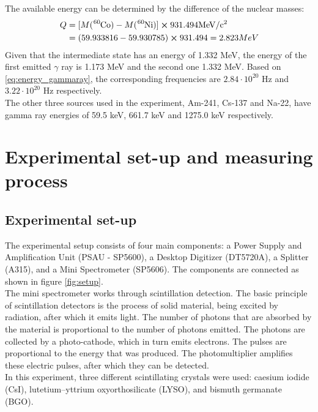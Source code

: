 \documentclass[a4paper, 11pt, table]{article}
\begin{document}
The available energy can be determined by the difference of the nuclear masses:
\begin{align*}
    Q & = [M(\ce{^{60}Co})  - M(\ce{^{60}Ni})]\cross 931.494 \mathrm{MeV/c^2} \\
      & = (59.933816 - 59.930785)\cross 931.494 = 2.823 MeV
\end{align*}
Given that the intermediate state has an energy of 1.332 MeV, the energy of the first emitted $\gamma$ ray is 1.173 MeV and the second one 1.332 MeV. Based on \cref{eq:energy_gammaray}, the corresponding frequencies are $2.84\cdot 10^{20}$ Hz and $3.22\cdot 10^{20}$ Hz respectively.\\
The other three sources used in the experiment, Am-241, Cs-137 and Na-22, have gamma ray energies of 59.5 keV, 661.7 keV and 1275.0 keV respectively.\cite{heath_scintillation_1964}




\section{Experimental set-up and measuring process}
\subsection{Experimental set-up}
The experimental setup consists of four main components: a Power Supply and Amplification Unit (PSAU - SP5600), a Desktop Digitizer (DT5720A), a Splitter (A315), and a Mini Spectrometer (SP5606). The components are connected as shown in figure \ref{fig:setup}. \\

The mini spectrometer works through scintillation detection. The basic principle of scintillation detectors is the process of solid material, being excited by radiation, after which it emits light. The number of photons that are absorbed by the material is proportional to the number of photons emitted. The photons are collected by a photo-cathode, which in turn emits electrons. The pulses are proportional to the energy that was produced. The photomultiplier amplifies these electric pulses, after which they can be detected. \cite{KRAMAR19992467}\\

In this experiment, three different scintillating crystals were used: caesium iodide (CsI), lutetium–yttrium oxyorthosilicate (LYSO), and bismuth germanate (BGO).\\
\end{document}
